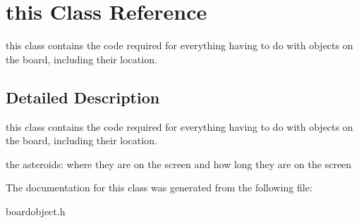 \hypertarget{classthis}{}\section{this Class Reference}
\label{classthis}


this class contains the code required for everything having to do with objects on the board, including their location.  




\subsection{Detailed Description}
this class contains the code required for everything having to do with objects on the board, including their location. 

the asteroids\+: where they are on the screen and how long they are on the screen 

The documentation for this class was generated from the following file\+:\begin{DoxyCompactItemize}
\item 
boardobject.\+h\end{DoxyCompactItemize}
